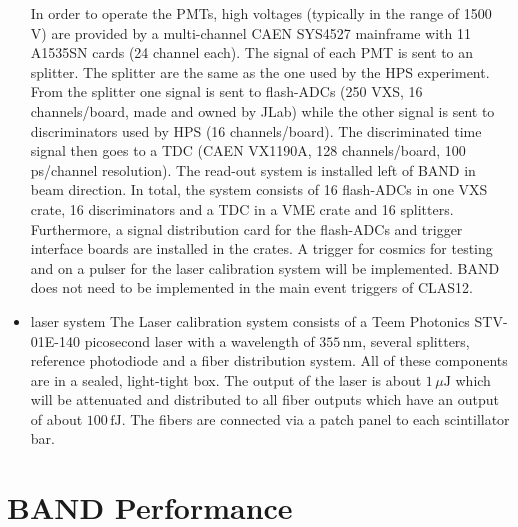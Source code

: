 \documentclass[review]{elsarticle}
\begin{document}
\begin{itemize}
In order to operate the PMTs, high voltages (typically in the range of 1500 V) are provided by a multi-channel CAEN SYS4527 mainframe with 11 A1535SN cards (24 channel each).
The signal of each PMT is sent to an splitter. The splitter are the same as the one used by the HPS experiment.
From the splitter one signal is sent to flash-ADCs (250 VXS, 16 channels/board, made and owned by JLab) while the other signal is sent to  discriminators used by HPS (16 channels/board).
The discriminated time signal then goes to a TDC (CAEN VX1190A, 128 channels/board, 100 ps/channel resolution). The read-out system is installed left of BAND in beam direction. 
In total, the system consists of 16 flash-ADCs in one VXS crate, 16 discriminators and a TDC in a VME crate and 16 splitters.  Furthermore, a signal distribution card for the flash-ADCs and trigger interface boards are installed in the crates. A trigger for cosmics for testing and on a pulser for the laser calibration system will be implemented. BAND does not need to be implemented in the main event triggers of CLAS12.


\item laser system
The Laser calibration system consists of a Teem Photonics STV-01E-140 picosecond laser with a wavelength of $355\,\mathrm{nm}$, several splitters, reference photodiode and a fiber distribution system. All of these components are in a sealed, light-tight box. The output of the laser is about $1\,\mu\mathrm{J}$ which will be attenuated and distributed to all fiber outputs which have an output of about $100\,\mathrm{fJ}$. The fibers are connected via a patch panel to each scintillator bar. 

\end{itemize}




\section{BAND Performance}
\end{document}
